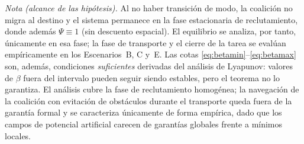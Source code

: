 \emph{Nota (alcance de las hipótesis).} Al no haber transición de modo, la
coalición no migra al destino y el sistema permanece en la fase estacionaria de
reclutamiento, donde además $\Psi \equiv 1$ (sin descuento espacial). El equilibrio
se analiza, por tanto, únicamente en esa fase; la fase de transporte y el cierre de
la tarea se evalúan empíricamente en los Escenarios~B, C y~E. Las cotas
\eqref{eq:betamin}--\eqref{eq:betamax} son, además, condiciones
\emph{suficientes} derivadas del análisis de Lyapunov: valores de $\beta$ fuera del
intervalo pueden seguir siendo estables, pero el teorema no lo garantiza. El análisis
cubre la fase de reclutamiento homogénea; la navegación de la coalición con evitación de
obstáculos durante el transporte queda fuera de la garantía formal y se caracteriza
únicamente de forma empírica, dado que los campos de potencial artificial carecen de
garantías globales frente a mínimos locales.

